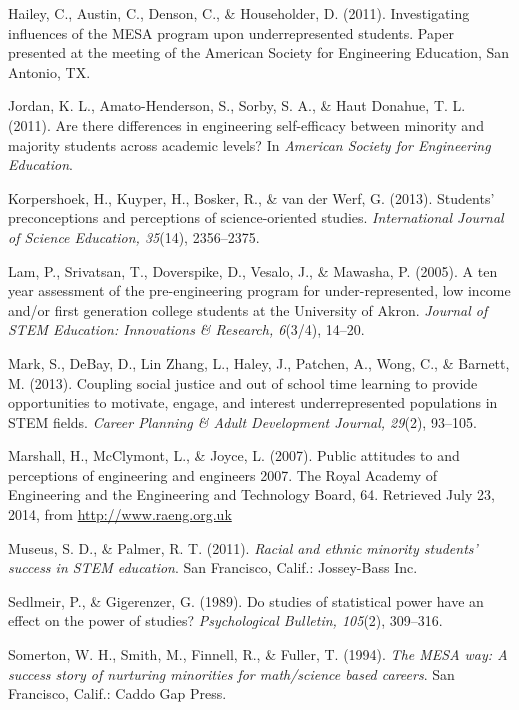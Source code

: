 \documentclass[11pt]{article}
\begin{document}
\begin{thebibliography}{99}
Hailey, C., Austin, C., Denson, C., \& Householder, D. (2011). Investigating influences of the MESA program upon underrepresented students. Paper presented at the meeting of the American Society for Engineering Education, San Antonio, TX.

Jordan, K. L., Amato-Henderson, S., Sorby, S. A., \& Haut Donahue, T. L. (2011). Are there differences in engineering self-efficacy between minority and majority students across academic levels? In \textit{American Society for Engineering Education}.

Korpershoek, H., Kuyper, H., Bosker, R., \& van der Werf, G. (2013). Students’ preconceptions and perceptions of science-oriented studies. \textit{International Journal of Science Education, 35}(14), 2356–2375.

Lam, P., Srivatsan, T., Doverspike, D., Vesalo, J., \& Mawasha, P. (2005). A ten year assessment of the pre-engineering program for under-represented, low income and/or first generation college students at the University of Akron. \textit{Journal of STEM Education: Innovations \& Research, 6}(3/4), 14–20.

Mark, S., DeBay, D., Lin Zhang, L., Haley, J., Patchen, A., Wong, C., \& Barnett, M. (2013). Coupling social justice and out of school time learning to provide opportunities to motivate, engage, and interest underrepresented populations in STEM fields. \textit{Career Planning \& Adult Development Journal, 29}(2), 93–105.

Marshall, H., McClymont, L., \& Joyce, L. (2007). Public attitudes to and perceptions of engineering and engineers 2007. The Royal Academy of Engineering and the Engineering and Technology Board, 64. Retrieved July 23, 2014, from \url{http://www.raeng.org.uk}

Museus, S. D., \& Palmer, R. T. (2011). \textit{Racial and ethnic minority students' success in STEM education}. San Francisco, Calif.: Jossey-Bass Inc.

Sedlmeir, P., \& Gigerenzer, G. (1989). Do studies of statistical power have an effect on the power of studies? \textit{Psychological Bulletin, 105}(2), 309–316.

Somerton, W. H., Smith, M., Finnell, R., \& Fuller, T. (1994). \textit{The MESA way: A success story of nurturing minorities for math/science based careers}. San Francisco, Calif.: Caddo Gap Press.


\end{thebibliography}
\end{document}
